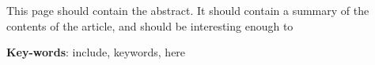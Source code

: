 
\setlength{\absparsep}{18pt} %
\begin{resumo}
    This page should contain the abstract. It should contain a summary of the contents of the article, and should be interesting enough to  
	\vspace{\onelineskip}
	\noindent 
	
	\textbf{Key-words}: include, keywords, here
\end{resumo}
